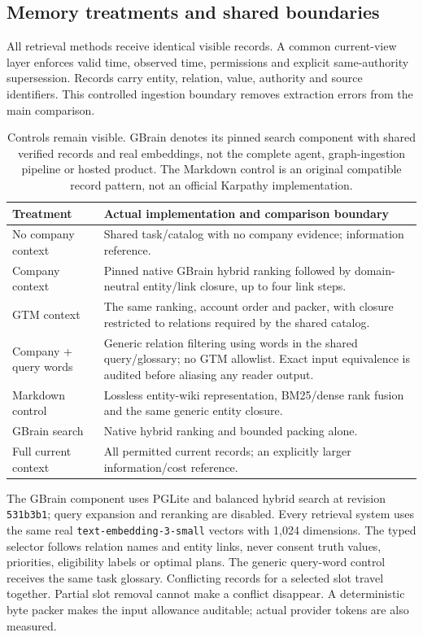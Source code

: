 \subsection{Memory treatments and shared boundaries}
All retrieval methods receive identical visible records. A common current-view layer enforces valid time, observed time, permissions and explicit same-authority supersession. Records carry entity, relation, value, authority and source identifiers. This controlled ingestion boundary removes extraction errors from the main comparison.

\begin{table}[t]
\small\centering
\begin{tabularx}{\linewidth}{lX}
\toprule
Treatment & Actual implementation and comparison boundary \\
\midrule
No company context & Shared task/catalog with no company evidence; information reference. \\
Company context & Pinned native GBrain hybrid ranking followed by domain-neutral entity/link closure, up to four link steps. \\
GTM context & The same ranking, account order and packer, with closure restricted to relations required by the shared catalog. \\
Company + query words & Generic relation filtering using words in the shared query/glossary; no GTM allowlist. Exact input equivalence is audited before aliasing any reader output. \\
Markdown control & Lossless entity-wiki representation, BM25/dense rank fusion and the same generic entity closure. \\
GBrain search & Native hybrid ranking and bounded packing alone. \\
Full current context & All permitted current records; an explicitly larger information/cost reference. \\
\bottomrule
\end{tabularx}
\caption{Controls remain visible. GBrain denotes its pinned search component with shared verified records and real embeddings, not the complete agent, graph-ingestion pipeline or hosted product. The Markdown control is an original compatible record pattern, not an official Karpathy implementation.}
\label{tab:methods}
\end{table}

The GBrain component uses PGLite and balanced hybrid search at revision \texttt{531b3b1}; query expansion and reranking are disabled. Every retrieval system uses the same real \texttt{text-embedding-3-small} vectors with 1,024 dimensions. The typed selector follows relation names and entity links, never consent truth values, priorities, eligibility labels or optimal plans. The generic query-word control receives the same task glossary. Conflicting records for a selected slot travel together. Partial slot removal cannot make a conflict disappear. A deterministic byte packer makes the input allowance auditable; actual provider tokens are also measured.

